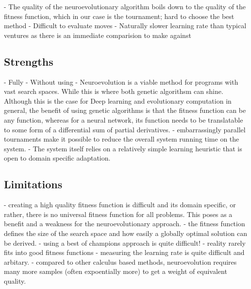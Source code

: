 \documentclass[12pt,a4paper]{article}
\begin{document}

    - The quality of the neuroevolutionary algorithm boils down to the quality of the fitness function, which in our case is the tournament; hard to choose the best method
    - Difficult to evaluate moves
    - Naturally slower learning rate than typical ventures as there is an immediate comparision to make against
    
    \subsection{Strengths}
    - Fully
    - Without using 
    - Neuroevolution is a viable method for programs with vast search spaces. While this is where both genetic algorithsm can shine. Although this is the case for Deep learning and evolutionary computation in general, the benefit of using genetic algorithms is that the fitness function can be any function, whereas for a neural network, its function needs to be translatable to some form of a differential sum of partial derivatives. 
    - embarrassingly parallel tournaments make it possible to reduce the overall system running time on the system.
    - The system itself relies on a relatively simple learning heuristic that is open to domain specific adaptation.

    \subsection{Limitations}
    - creating a high quality fitness function is difficult and its domain specific, or rather, there is no universal fitness function for all problems. This poses as a benefit and a weakness for the neuroevolutionary approach.
        - the fitness function defines the size of the search space and how easily a globally optimal solution can be derived.
        - using a best of champions approach is quite difficult!
        - reality rarely fits into good fitness functions
    - measuring the learning rate is quite difficult and arbitary.
    - compared to other calculus based methods, neuroevolution requires many more samples (often expoentially more) to get a weight of equivalent quality.
\end{document}
